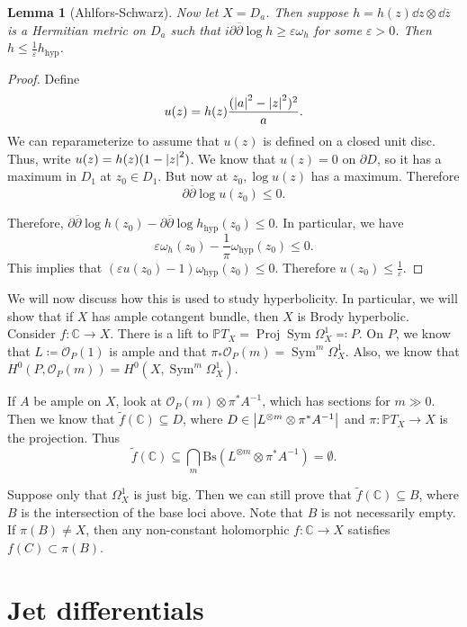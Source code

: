 \documentclass[leqno, openany]{memoir}
\newtheorem{lem}[thm]{Lemma}
\theoremstyle{definition}
\theoremstyle{remark}
\theoremstyle{plain}
\theoremstyle{definition}
\theoremstyle{remark}
\newcommand{\C}{\mathbb{C}}
\renewcommand{\P}{\mathbb{P}}
\newcommand{\ep}{\varepsilon}
\newcommand{\mc}[1]{\mathcal{#1}}
\newcommand{\mr}[1]{\mathrm{#1}}
\newcommand{\on}[1]{\operatorname{#1}}
\newcommand{\ol}[1]{\overline{#1}}
\newcommand{\wt}[1]{\widetilde{#1}}
\DeclareMathOperator{\Proj}{Proj}
\begin{document}
\begin{lem}[Ahlfors-Schwarz]
    Now let $X = D_a$. Then suppose $h = h(z) \dd{z} \otimes \dd{\ol{z}}$ is a Hermitian metric on $D_a$ such that $i \partial \ol{\partial} \log h \geq \ep \omega_h$ for some $\ep > 0$. Then $h \leq \frac{1}{\ep} h_{\mr{hyp}}$.
\end{lem}

\begin{proof}
    Define 
    \[ u(z) = h(z) \frac{( \abs{a}^2 - \abs{z}^2 )^2}{a}. \] 
    We can reparameterize to assume that $u(z)$ is defined on a closed unit disc. Thus, write $u(z) = h(z) (1-\abs{z}^2)$. We know that $u(z) = 0$ on $\partial D$, so it has a maximum in $D_1$ at $z_0 \in D_1$. But now at $z_0, \log u(z)$ has a maximum. Therefore 
    \[\partial \ol{\partial} \log u(z_0) \leq 0. \]

    Therefore, $\partial \ol{\partial} \log h(z_0) - \partial \ol{\partial} \log h_{\mr{hyp}}(z_0) \leq 0$. In particular, we have
    \[ \ep \omega_h(z_0) - \frac{1}{\pi} \omega_{\mr{hyp}}(z_0) \leq 0. \]
    This implies that $(\ep u(z_0) - 1) \omega_{\mr{hyp}}(z_0) \leq 0$. Therefore $u(z_0) \leq \frac{1}{\ep}$.
\end{proof}

We will now discuss how this is used to study hyperbolicity. In particular, we will show that if $X$ has ample cotangent bundle, then $X$ is Brody hyperbolic. Consider $f \colon \C \to X$. There is a lift to $\P T_X = \Proj \on{Sym} \Omega^1_X \eqqcolon P$. On $P$, we know that $L \coloneqq \mc{O}_P(1)$ is ample and that $\pi_* \mc{O}_P(m) = \on{Sym}^m \Omega^1_X$. Also, we know that $H^0(P, \mc{O}_P(m)) = H^0(X, \on{Sym}^m \Omega^1_X)$.

If $A$ be ample on $X$, look at $\mc{O}_P(m) \otimes \pi^* A^{-1}$, which has sections for $m \gg 0$. Then we know that $\wt{f}(\C) \subseteq D$, where $D \in \abs{L^{\otimes m} \otimes \pi^* A^{-1}}$ and $\pi \colon \P T_X \to X$ is the projection. Thus 
\[ \wt{f}(\C) \subseteq \bigcap_m \mr{Bs}(L^{\otimes m} \otimes \pi^* A^{-1}) = \emptyset. \]

Suppose only that $\Omega^1_X$ is just big. Then we can still prove that $\wt{f}(\C) \subseteq B$, where $B$ is the intersection of the base loci above. Note that $B$ is not necessarily empty. If $\pi(B) \neq X$, then any non-constant holomorphic $f \colon \C \to X$ satisfies $f(C) \subset \pi(B)$.

\section{Jet differentials}
\end{document}
